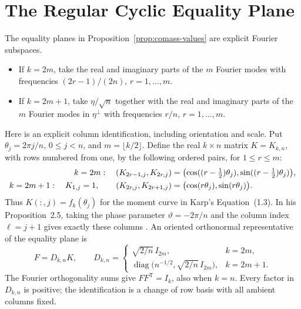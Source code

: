 \documentclass[11pt]{article}
\begin{document}
\section{The Regular Cyclic Equality Plane}
\label{sec:cyclic-equality-plane}

The equality planes in Proposition~\ref{prop:comass-values} are explicit
Fourier subspaces.

\begin{itemize}
\item If \(k=2m\), take the real and imaginary parts of the \(m\) Fourier
  modes with frequencies \((2r-1)/(2n)\), \(r=1,\ldots,m\).
\item If \(k=2m+1\), take \(\eta/\sqrt n\) together with the real and imaginary
  parts of the \(m\) Fourier modes in \(\eta^\perp\) with frequencies
  \(r/n\), \(r=1,\ldots,m\).
\end{itemize}

Here is an explicit column identification, including orientation and scale.
Put \(\theta_j=2\pi j/n\), \(0\leq j<n\), and \(m=\lfloor k/2\rfloor\).
Define the real \(k\times n\) matrix \(K=K_{k,n}\), with rows numbered from
one, by the following ordered pairs, for \(1\leq r\leq m\):
\begin{align}
k=2m:\quad
 (K_{2r-1,j},K_{2r,j})
 &=\bigl(\cos((r-\tfrac12)\theta_j),
          \sin((r-\tfrac12)\theta_j)\bigr),\notag\\
k=2m+1:\quad K_{1,j}=1,\qquad
 (K_{2r,j},K_{2r+1,j})
 &=\bigl(\cos(r\theta_j),\sin(r\theta_j)\bigr).
\label{eq:fourier-karp-rows}
\end{align}
Thus \(K(:,j)=f_k(\theta_j)\) for the moment curve in Karp's
Equation~(1.3). In his Proposition~2.5, taking the phase parameter
\(\vartheta=-2\pi/n\) and the column index \(\ell=j+1\) gives exactly
these columns \cite[arXiv~v2 numbering]{Karp2018}. An oriented orthonormal
representative of the equality plane is
\begin{equation}
 F=D_{k,n}K,\qquad
 D_{k,n}=\begin{cases}
    \sqrt{2/n}\,I_{2m},&k=2m,\\
    \operatorname{diag}\bigl(n^{-1/2},\sqrt{2/n}\,I_{2m}\bigr),&k=2m+1.
 \end{cases}
\label{eq:fourier-karp-match}
\end{equation}
The Fourier orthogonality sums give \(FF^{\mathsf T}=I_k\), also when
\(k=n\). Every factor in \(D_{k,n}\) is positive; the identification is
a change of row basis with all ambient columns fixed.
\end{document}
